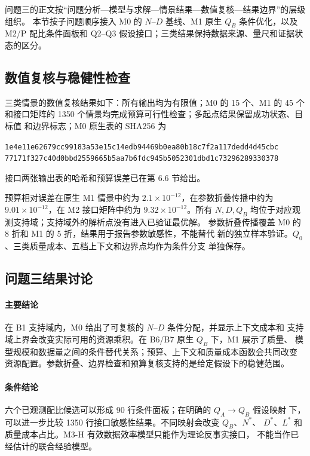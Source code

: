 问题三的正文按“问题分析—模型与求解—情景结果—数值复核—结果边界”的层级组织。
本节按子问题顺序接入 M0 的 $N$--$D$ 基线、M1 原生 $Q_B$ 条件优化，以及
M2/P 配比条件面板和 Q2--Q3 假设接口；三类结果保持数据来源、量尺和证据状态的区分。






\subsection{数值复核与稳健性检查}
\label{sec:q3-validation}

三类情景的数值复核结果如下：所有输出均为有限值；M0 的 15 个、M1 的 45 个
和接口矩阵的 1350 个情景均完成预算可行性检查；多起点结果保留成功状态、目标值
和边界标志；M0 原生表的 SHA256 为
\begin{center}
{\scriptsize\texttt{1e4e11e62679cc99183a53e15c14edb94469b0ea80b18c7f2a117dedd4d45cbc}}\\
{\scriptsize\texttt{77171f327c40d0bbd2559665b5aa7b6fdc945b5052301dbd1c73296289330378}}
\end{center}
接口两张输出表的哈希和预算误差已在第 6.6 节给出。

预算相对误差在原生 M1 情景中约为 $2.1\times10^{-12}$，在参数折叠传播中约为
$9.01\times10^{-12}$，在 M2 接口矩阵中约为 $9.32\times10^{-12}$。所有
$N,D,Q_B$ 均位于对应观测支持域；支持域外的解析点没有进入已验证最优解。
参数折叠传播覆盖 M0 的 8 折和 M1 的 5 折，结果用于报告参数敏感性，不能替代
新的独立样本验证。$Q_0$、三类质量成本、五档上下文和边界点均作为条件分支
单独保存。

\subsection{问题三结果讨论}
\label{sec:q3-discussion}

\paragraph{主要结论}
在 B1 支持域内，M0 给出了可复核的 $N$--$D$ 条件分配，并显示上下文成本和
支持域上界会改变实际可用的资源乘积。在 B6/B7 原生 $Q_B$ 下，M1 展示了质量、
模型规模和数据量之间的条件替代关系；预算、上下文和质量成本函数会共同改变
资源配置。参数折叠、边界检查和预算复核支持的是给定假设下的稳健范围。

\paragraph{条件结论}
六个已观测配比候选可以形成 90 行条件面板；在明确的 $Q_A\to Q_B$ 假设映射
下，可以进一步比较 1350 行接口敏感性结果。不同映射会改变 $Q_B$、$N^*$、
$D^*$、$L^*$ 和质量成本占比。M3-H 有效数据效率模型只能作为理论反事实接口，
不能当作已经估计的联合经验模型。

